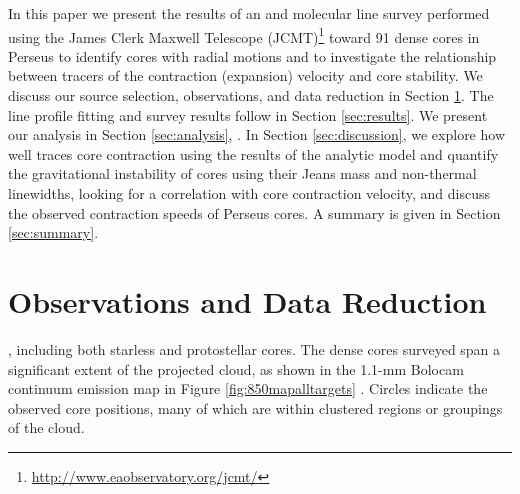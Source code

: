 \documentclass[iop,twocolappendix]{emulateapj}
\begin{document}
In this paper we present the results of an {\HCOrot} and {\NtDrot} molecular line survey performed using the James Clerk Maxwell Telescope (JCMT)\footnote{\url{http://www.eaobservatory.org/jcmt/}} toward 91 dense cores in Perseus to identify cores with radial motions and to investigate the relationship between tracers of the contraction (expansion) velocity and core stability. 
%
We discuss our source selection, observations, and data reduction in Section \ref{sec:obs}.
%
The line profile fitting and survey results follow in Section \ref{sec:results}.
%
We present our  analysis in Section \ref{sec:analysis}, .
%
In Section \ref{sec:discussion}, we explore how well {\deltaV} traces core contraction using the results of the analytic model and quantify the gravitational instability of cores using their Jeans mass and non-thermal linewidths, looking for a correlation with core contraction velocity, and discuss the observed contraction speeds of Perseus cores.
%
A summary is given in Section \ref{sec:summary}.

\section{Observations and Data Reduction}
\label{sec:obs}

, including both starless and protostellar cores. The dense cores surveyed span a significant extent of the projected cloud, as shown in the 1.1-mm Bolocam continuum emission map in Figure \ref{fig:850mapalltargets} \citep{Enoch2006}. Circles indicate the observed core positions, many of which are within clustered regions or groupings of the cloud. 
\end{document}
